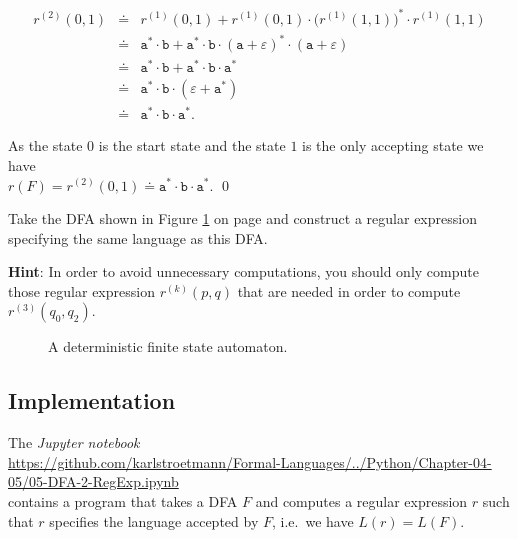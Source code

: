 \begin{enumerate}
\begin{eqnarray*}
                  r^{(2)}(0, 1)
            & \doteq & r^{(1)}(0, 1) + 
                  r^{(1)}(0, 1) \cdot \bigl(r^{(1)}(1, 1)\bigr)^* \cdot r^{(1)}(1, 1) \\
            & \doteq & \texttt{a}^* \cdot \texttt{b} + 
                  \texttt{a}^* \cdot \texttt{b} \cdot (\texttt{a} + \varepsilon)^* \cdot (\texttt{a} + \varepsilon) \\
            & \doteq & \texttt{a}^* \cdot \texttt{b} + \texttt{a}^* \cdot \texttt{b} \cdot \texttt{a}^* \\
            & \doteq & \texttt{a}^* \cdot \texttt{b} \cdot (\varepsilon + \texttt{a}^*) \\
            & \doteq & \texttt{a}^* \cdot \texttt{b} \cdot \texttt{a}^*.
        \end{eqnarray*}
\end{enumerate}
As the state 0 is the start state and the state $1$ is the only accepting state we have
\\[0.2cm]
\hspace*{1.3cm}
$r(F) = r^{(2)}(0, 1) \doteq \texttt{a}^* \cdot \texttt{b} \cdot \texttt{a}^*$.
\qed


\exerciseEng
Take the \textsc{DFA} shown in Figure \ref{fig:exercise-13.eps} on page
\pageref{fig:exercise-13.eps} and construct a regular expression specifying the same language as this
\textsc{DFA}.
\vspace*{0.1cm}

\noindent
\textbf{Hint}: In order to avoid unnecessary computations, you should only compute those regular expression
$r^{(k)}(p, q)$ that are needed in order to compute $r^{(3)}(q_0, q_2)$. 
\eox

\begin{figure}[!ht]
  \centering
{}
\caption{A deterministic finite state automaton.}
\label{fig:exercise-13.eps}
\end{figure}

\subsection{Implementation}
The \textsl{Jupyter notebook} 
\\[0.2cm]
\hspace*{-0.3cm}
\href{https://github.com/karlstroetmann/Formal-Languages/blob/master/Python/Chapter-04-05/05-DFA-2-RegExp.ipynb}{https://github.com/karlstroetmann/Formal-Languages/../Python/Chapter-04-05/05-DFA-2-RegExp.ipynb}
\\[0.2cm]
contains a program that takes a  \textsc{DFA} $F$ and computes a regular expression $r$ such that
$r$ specifies the language accepted by $F$, i.e.~we have $L(r) = L(F)$.


